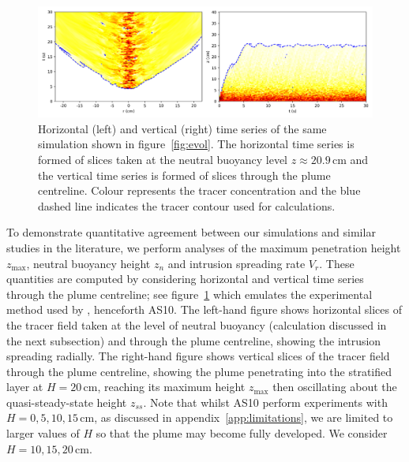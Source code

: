 \documentclass[a4paper]{article}
\begin{document}
\begin{figure}
	\centering
	\includegraphics[width=.9\textwidth]{timeseries}
	\caption{Horizontal (left) and vertical (right) time series of the same simulation shown in
		figure~\ref{fig:evol}. The horizontal time series is formed of slices taken at the neutral buoyancy
		level $z \approx 20.9 \, \mathrm{cm}$ and the vertical time series is formed of slices through the
		plume centreline. Colour represents the tracer concentration and the blue dashed line indicates the
		tracer contour used for calculations.}
	\label{fig:timeseries}
\end{figure}

To demonstrate quantitative agreement between our simulations and similar studies in the literature, we
perform analyses of the maximum penetration height $z_{\max}$, neutral buoyancy height $z_n$ and intrusion
spreading rate $V_r$. These quantities are computed by considering horizontal and vertical time series through
the plume centreline; see figure~\ref{fig:timeseries} which emulates the experimental method used by
\citet{ansong2010}, henceforth AS10. The left-hand figure shows horizontal slices of the tracer field taken
at the level of neutral buoyancy (calculation discussed in the next subsection) and through the plume
centreline, showing the intrusion spreading radially. The right-hand figure shows vertical slices of the
tracer field through the plume centreline, showing the plume penetrating into the stratified layer at $H=20 \,
\mathrm{cm}$, reaching its maximum height $z_{\max}$ then oscillating about the quasi-steady-state height
$z_{ss}$. Note that whilst AS10 perform experiments with $H = 0, 5, 10, 15 \, \mathrm{cm}$, as discussed in
appendix~\ref{app:limitations}, we are limited to larger values of $H$ so that the plume may become fully
developed. We consider $H = 10, 15, 20 \,\mathrm{cm}$.
\end{document}
